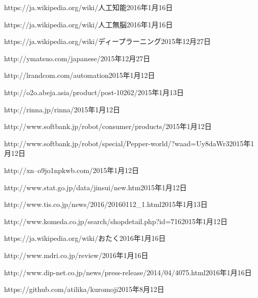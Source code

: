 \documentclass[a4paper,10pt,onecolumn,oneside,openany]{jsbook}
\begin{document}
\begin{thebibliography}{99}

	{https://ja.wikipedia.org/wiki/人工知能}{2016年1月16日}

	{https://ja.wikipedia.org/wiki/人工無脳}{2016年1月16日}

	{https://ja.wikipedia.org/wiki/ディープラーニング}{2015年12月27日}

	{http://ymatsuo.com/japanese/}{2015年12月27日}

	{http://lrandcom.com/automation}{2015年1月12日}

	{http://o2o.abeja.asia/product/post-10262/}{2015年1月13日}

	{http://rinna.jp/rinna/}{2015年1月12日}

	{http://www.softbank.jp/robot/consumer/products/}{2015年1月12日}

	{http://www.softbank.jp/robot/special/Pepper-world/?waad=Uy8daWr3}{2015年1月12日}

	{http://xn--o9jo1npkwb.com/}{2015年1月12日}

	{http://www.stat.go.jp/data/jinsui/new.htm}{2015年1月12日}

	{http://www.tis.co.jp/news/2016/20160112_1.html}{2015年1月13日}

	{http://www.komeda.co.jp/search/shopdetail.php?id=716}{2015年1月12日}

	{https://ja.wikipedia.org/wiki/おたく}{2016年1月16日}

	{http://www.mdri.co.jp/review/}{2016年1月16日}

	{http://www.dip-net.co.jp/news/press-release/2014/04/4075.html}{2016年1月16日}



	{https://github.com/atilika/kuromoji}{2015年8月12日}


\end{thebibliography}
\end{document}
